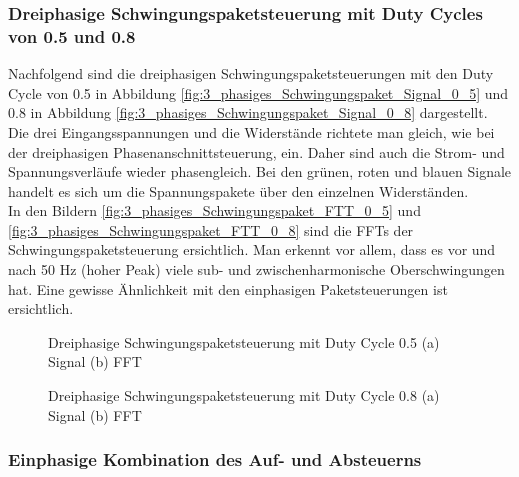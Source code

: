 \newpage

\subsubsection{Dreiphasige Schwingungspaketsteuerung mit Duty Cycles von 0.5 und 0.8}\label{sec:Schwingungspaketsteuerung_Simulation}
Nachfolgend sind die dreiphasigen Schwingungspaketsteuerungen mit den Duty Cycle von 0.5 in Abbildung \ref{fig:3_phasiges_Schwingungspaket_Signal_0_5} und 0.8 in Abbildung \ref{fig:3_phasiges_Schwingungspaket_Signal_0_8} dargestellt. Die drei Eingangsspannungen und die Widerstände richtete man gleich, wie bei der dreiphasigen Phasenanschnittsteuerung, ein. Daher sind auch die Strom- und Spannungsverläufe wieder phasengleich. Bei den grünen, roten und blauen Signale handelt es sich um die Spannungspakete über den einzelnen Widerständen.\\
In den Bildern \ref{fig:3_phasiges_Schwingungspaket_FTT_0_5} und \ref{fig:3_phasiges_Schwingungspaket_FTT_0_8} sind die FFTs der Schwingungspaketsteuerung ersichtlich. Man erkennt vor allem, dass es vor und nach 50 Hz (hoher Peak) viele sub- und zwischenharmonische Oberschwingungen hat. Eine gewisse Ähnlichkeit mit den einphasigen Paketsteuerungen ist ersichtlich.
 

\begin{figure}[ht!]
	\centering
	\qquad
	\caption{Dreiphasige Schwingungspaketsteuerung mit Duty Cycle 0.5 (a) Signal (b) FFT}
	\label{fig:3_phasiges_Schwingungspaket_0_5}
\end{figure}



\begin{figure}[ht!]
	\centering
	\qquad
	\caption{Dreiphasige Schwingungspaketsteuerung mit Duty Cycle 0.8 (a) Signal (b) FFT}
	\label{fig:3_phasiges_Schwingungspaket_0_8}
\end{figure}

\newpage
\subsubsection{Einphasige Kombination des Auf- und Absteuerns}

